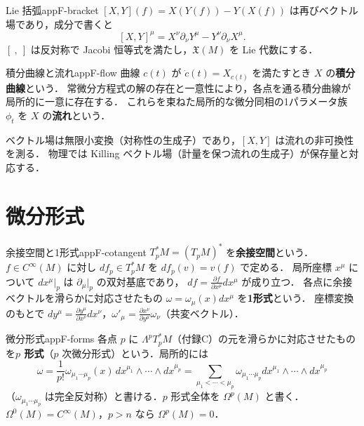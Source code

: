 \begin{mydef}{Lie 括弧}{appF-bracket}
$[X,Y](f)=X(Y(f))-Y(X(f))$ は再びベクトル場であり，成分で書くと
\[
[X,Y]^\mu=X^\nu\partial_\nu Y^\mu-Y^\nu\partial_\nu X^\mu .
\]
$[\ ,\ ]$ は反対称で Jacobi 恒等式を満たし，$\mathfrak X(M)$ を Lie 代数にする．
\end{mydef}

\begin{mydef}{積分曲線と流れ}{appF-flow}
曲線 $c(t)$ が $\dot c(t)=X_{c(t)}$ を満たすとき $X$ の\textbf{積分曲線}という．
常微分方程式の解の存在と一意性により，各点を通る積分曲線が局所的に一意に存在する．
これらを束ねた局所的な微分同相の1パラメータ族 $\phi_t$ を $X$ の\textbf{流れ}という．
\end{mydef}

ベクトル場は無限小変換（対称性の生成子）であり，$[X,Y]$ は流れの非可換性を測る．
物理では Killing ベクトル場（計量を保つ流れの生成子）が保存量と対応する．

\section{微分形式}

\begin{mydef}{余接空間と1形式}{appF-cotangent}
$T_p^*M=(T_pM)^*$ を\textbf{余接空間}という．$f\in C^\infty(M)$ に対し $df_p\in T^*_pM$ を $df_p(v)=v(f)$ で定める．
局所座標 $x^\mu$ について $dx^\mu|_p$ は $\partial_\mu|_p$ の双対基底であり，
$df=\frac{\partial f}{\partial x^\mu}dx^\mu$ が成り立つ．
各点に余接ベクトルを滑らかに対応させたもの $\omega=\omega_\mu(x)dx^\mu$ を\textbf{1形式}という．
座標変換のもとで $dy^\mu=\frac{\partial y^\mu}{\partial x^\nu}dx^\nu$，$\omega'_\mu=\frac{\partial x^\nu}{\partial y^\mu}\omega_\nu$（共変ベクトル）．
\end{mydef}

\begin{mydef}{微分形式}{appF-forms}
各点 $p$ に $\Lambda^pT_p^*M$（付録C）の元を滑らかに対応させたものを\textbf{$p$ 形式}（$p$ 次微分形式）という．局所的には
\[
\omega=\frac1{p!}\omega_{\mu_1\cdots\mu_p}(x)\,dx^{\mu_1}\wedge\cdots\wedge dx^{\mu_p}
=\sum_{\mu_1<\cdots<\mu_p}\omega_{\mu_1\cdots\mu_p}dx^{\mu_1}\wedge\cdots\wedge dx^{\mu_p}
\]
（$\omega_{\mu_1\cdots\mu_p}$ は完全反対称）と書ける．$p$ 形式全体を $\Omega^p(M)$ と書く．
$\Omega^0(M)=C^\infty(M)$，$p>n$ なら $\Omega^p(M)=0$．
\end{mydef}

